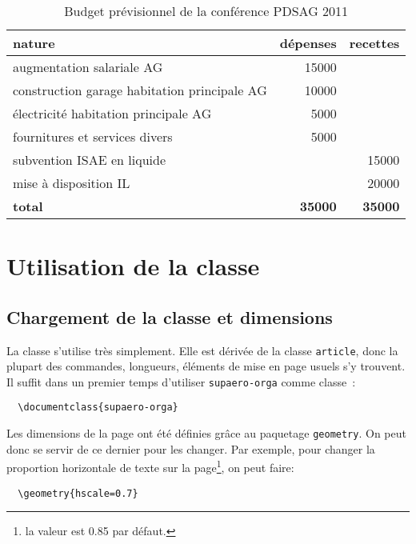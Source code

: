 \documentclass[fr]{supaero-orga}
\begin{document}
\begin{table}[h]
  \centering
  \begin{tabular}[h]{l r r}
    \toprule[1.5pt]
    \textbf{nature} & \textbf{dépenses} & \textbf{recettes}\\
    \midrule
    augmentation salariale AG & 15000 & \\
    construction garage habitation principale AG & 10000\\
    électricité habitation principale AG & 5000\\
    fournitures et services divers & 5000\\
    \midrule
    subvention ISAE en liquide & & 15000\\
    mise à disposition IL & & 20000\\
    \midrule
    \textbf{total} & \textbf{35000} & \textbf{35000}\\
    \bottomrule[1.5pt]
  \end{tabular}
  \caption{Budget prévisionnel de la conférence PDSAG 2011}
  \label{tab:budget}
\end{table}

\section{Utilisation de la classe}
\label{sec:utilisation-de-la}

\subsection{Chargement de la classe et dimensions}
\label{sec:chargement-classe}

La classe s'utilise très simplement. Elle est dérivée de la classe
\texttt{article}, donc la plupart des commandes, longueurs, éléments
de mise en page usuels s'y trouvent. Il suffit dans un premier temps
d'utiliser \texttt{supaero-orga} comme classe~:

\begin{verbatim}
  \documentclass{supaero-orga}
\end{verbatim}

Les dimensions de la page ont été définies grâce au paquetage
\texttt{geometry}. On peut donc se servir de ce dernier pour les
changer. Par exemple, pour changer la proportion horizontale de texte
sur la page\footnote{la valeur est 0.85 par défaut.}, on peut faire:

\begin{verbatim}
  \geometry{hscale=0.7}
\end{verbatim}
\end{document}
